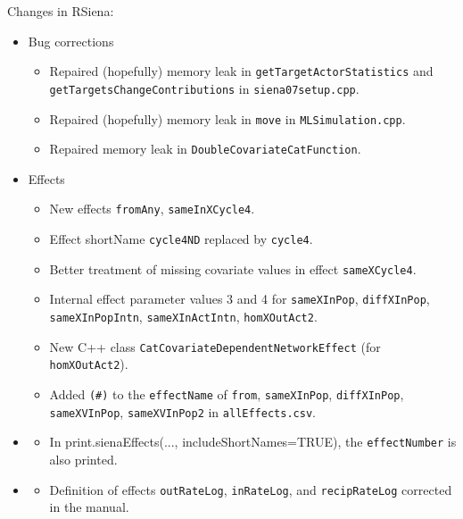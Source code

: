 \documentclass[a4paper,fleqn,11pt]{article}
\newcommand{\+}{\, + \,}
\newcommand{\sfn}[1]{\textsf{#1}}
\begin{document}
\begin{small}
\begin{itemize}
Changes in RSiena:
\begin{itemize}
 \item Bug corrections
 \begin{itemize}
  \item Repaired (hopefully) memory leak in
   \texttt{getTargetActorStatistics} and\\
      \texttt{getTargetsChangeContributions} in \texttt{siena07setup.cpp}.
  \item Repaired (hopefully) memory leak in
      \texttt{move} in \texttt{MLSimulation.cpp}.
  \item Repaired memory leak in \texttt{DoubleCovariateCatFunction}.
 \end{itemize}
 \item  Effects
 \begin{itemize}
  \item New effects \texttt{fromAny}, \texttt{sameInXCycle4}.
  \item Effect shortName \texttt{cycle4ND} replaced by \texttt{cycle4}.
  \item Better treatment of missing covariate values in effect \texttt{sameXCycle4}.
  \item Internal effect parameter values 3 and 4 for \texttt{sameXInPop},
      \texttt{diffXInPop},
      \texttt{sameXInPopIntn},
      \texttt{sameXInActIntn},
      \texttt{homXOutAct2}.
  \item New C++ class \texttt{CatCovariateDependentNetworkEffect}
      (for \texttt{homXOutAct2}).
  \item Added \texttt{(\#)} to the \texttt{effectName} of \texttt{from},
      \texttt{sameXInPop},
      \texttt{diffXInPop},
      \texttt{sameXVInPop},
      \texttt{sameXVInPop2}
      in \texttt{allEffects.csv}.
 \end{itemize}
 \item
 \begin{itemize} New functionality
  \item In \sfn{print.sienaEffects(..., includeShortNames=TRUE)},
      the \texttt{effectNumber} is also printed.
 \end{itemize}
 \item
 \begin{itemize} Changes in documentation:
  \item Definition of effects \texttt{outRateLog}, \texttt{inRateLog}, and \texttt{recipRateLog}
      corrected in the manual.
 \end{itemize}
\end{itemize}


\end{itemize}
\end{small}
\end{document}
